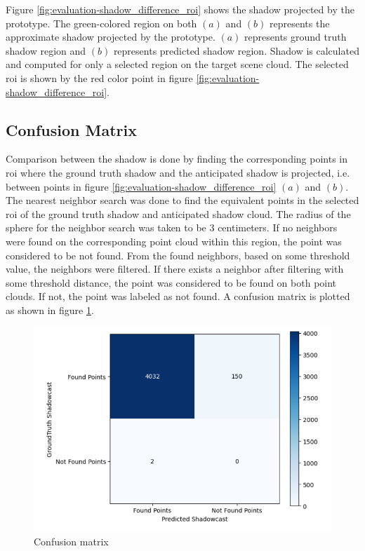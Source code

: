 Figure \ref{fig:evaluation-shadow_difference_roi} shows the shadow projected by the prototype. The green-colored region on both \((a)\) and \((b)\) represents the approximate shadow projected by the prototype. \((a)\) represents ground truth shadow region and \((b)\) represents predicted shadow region.  Shadow is calculated and computed for only a selected region on the target scene cloud. The selected \acrfull{roi} is shown by the red color point in figure \ref{fig:evaluation-shadow_difference_roi}.

\subsection{Confusion Matrix}
Comparison between the shadow is done by finding the corresponding points in \acrshort{roi} where the ground truth shadow and the anticipated shadow is projected, i.e. between points in figure \ref{fig:evaluation-shadow_difference_roi} \((a)\) and \((b)\). The nearest neighbor search was done to find the equivalent points in the selected \acrshort{roi} of the ground truth shadow and anticipated shadow cloud. The radius of the sphere for the neighbor search was taken to be 3 centimeters. If no neighbors were found on the corresponding point cloud within this region, the point was considered to be not found. From the found neighbors, based on some threshold value, the neighbors were filtered. If there exists a neighbor after filtering with some threshold distance, the point was considered to be found on both point clouds. If not, the point was labeled as not found. A confusion matrix is plotted as shown in figure \ref{fig:evaluation_cm}.

\begin{figure}[htbp]
    \centering
    \includegraphics[width=1\linewidth]{97_graphics/evaluation/cm_shadowcast.pdf}
    \caption{Confusion matrix}
    \label{fig:evaluation_cm}
\end{figure}

